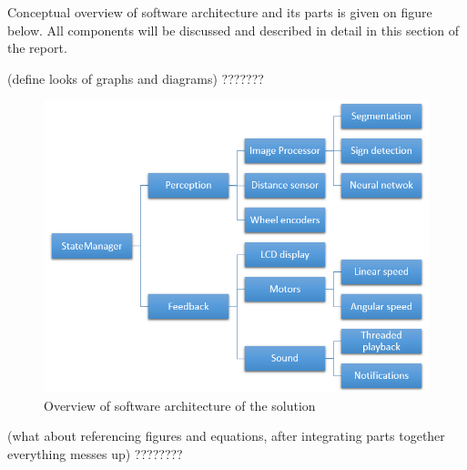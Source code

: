 
Conceptual overview of software architecture and its parts is given on figure below. All components will be discussed and described in detail in this section of the report. 

(define looks of graphs and diagrams) ???????

\begin{figure}[th!]
\center
\includegraphics[scale=0.7]{images/software-architecture.png}
\caption{Overview of software architecture of the solution}
\end{figure}

(what about referencing figures and equations, after integrating parts together everything messes up) ????????


